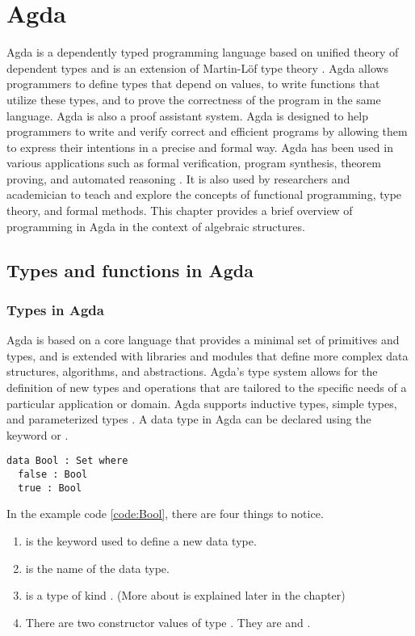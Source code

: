 \chapter{Agda}
Agda is a dependently typed programming language based on unified theory of
dependent types and is an extension of Martin-Löf type theory \cite{AgdaDoc}.
Agda allows programmers to define types that depend on values, to write
functions that utilize these types, and to prove the correctness of the program
in the same language\cite{AgdaTB}. Agda is also a proof assistant system. Agda
is designed to help programmers to write and verify correct and efficient
programs by allowing them to express their intentions in a precise and formal
way. Agda has been used in various applications such as formal verification,
program synthesis, theorem proving, and automated reasoning
\cite{2019arXiv191203028S}. It is also used by researchers and academician to
teach and explore the concepts of functional programming, type theory, and
formal methods. This chapter provides a brief overview of programming in Agda in
the context of algebraic structures. 

\section{Types and functions in Agda}
\label{types}
\subsection{Types in Agda}
Agda is based on a core language that provides a minimal set of primitives and
types, and is extended with libraries and modules that define more complex data
structures, algorithms, and abstractions. Agda's type system allows for the
definition of new types and operations that are tailored to the specific needs
of a particular application or domain. Agda supports inductive types, simple
types, and parameterized types \cite{10.1007/978-3-642-03359-9_6}. A data type
in Agda can be declared using the keyword  or . 

\label{code:Bool}
\begin{verbatim}
data Bool : Set where
  false : Bool 
  true : Bool
\end{verbatim}

In the example code \ref{code:Bool}, there are four things to notice.
\begin{enumerate}
  \item {} is the keyword used to define a new data type. 
  \item {} is the name of the data type.
  \item {} is a type of kind . (More about  is explained later in the chapter)
  \item There are two constructor values of type . They are
   and .
\end{enumerate} 

